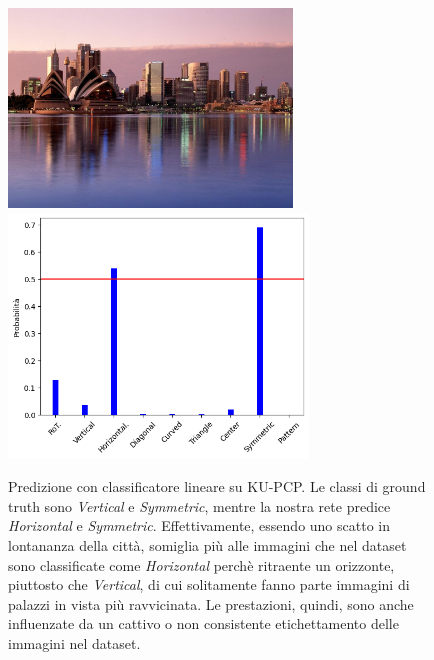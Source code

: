 \begin{figure}[p]
    \centering
    \includegraphics[height=53mm, valign=t]{Immagini/risultati/0626.jpg}
    \includegraphics[height=65mm, valign=t]{Immagini/risultati/626_prob.png}
    \caption{Predizione con classificatore lineare su KU-PCP. Le classi di ground truth sono \textit{Vertical} e \textit{Symmetric}, mentre la nostra rete predice \textit{Horizontal} e \textit{Symmetric}. Effettivamente, essendo uno scatto in lontananza della città, somiglia più alle immagini che nel dataset sono classificate come \textit{Horizontal} perchè ritraente un orizzonte, piuttosto che \textit{Vertical}, di cui solitamente fanno parte immagini di palazzi in vista più ravvicinata. Le prestazioni, quindi, sono anche influenzate da un cattivo o non consistente etichettamento delle immagini nel dataset.}
    \label{fig:kupcp_prob2}
\end{figure}



